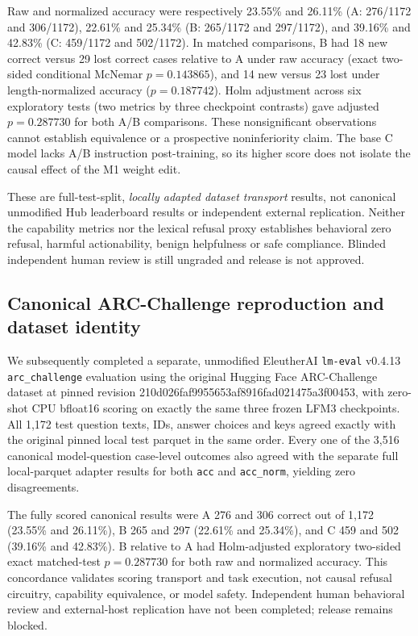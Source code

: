 \documentclass[11pt]{article}
\begin{document}
Raw and normalized accuracy were respectively 23.55\%
and 26.11\% (A: 276/1172 and 306/1172),
22.61\% and 25.34\% (B: 265/1172 and 297/1172),
and 39.16\% and 42.83\% (C: 459/1172 and
502/1172). In matched comparisons, B had 18 new
correct versus 29 lost correct cases relative to A
under raw accuracy (exact two-sided conditional
McNemar $p=0.143865$), and 14 new versus 23 lost
under length-normalized accuracy ($p=0.187742$).
Holm adjustment across six exploratory tests
(two metrics by three checkpoint contrasts)
gave adjusted $p=0.287730$ for both A/B
comparisons. These nonsignificant observations
cannot establish equivalence or a prospective
noninferiority claim. The base C model lacks
A/B instruction post-training, so its higher
score does not isolate the causal effect of
the M1 weight edit.

These are full-test-split, \emph{locally adapted
dataset transport} results, not canonical
unmodified Hub leaderboard results or
independent external replication. Neither
the capability metrics nor the lexical
refusal proxy establishes behavioral
zero refusal, harmful actionability, benign
helpfulness or safe compliance. Blinded
independent human review is still ungraded
and release is not approved.

\subsection{Canonical ARC-Challenge reproduction and dataset identity}
We subsequently completed a separate, unmodified EleutherAI
\texttt{lm-eval} v0.4.13 \texttt{arc\_challenge}
evaluation using the original Hugging Face ARC-Challenge
dataset at pinned revision 210d026faf9955653af8916fad021475a3f00453,
with zero-shot CPU bfloat16 scoring on exactly the same three
frozen LFM3 checkpoints. All 1,172 test question texts,
IDs, answer choices and keys agreed exactly with the
original pinned local test parquet in the same order.
Every one of the 3,516 canonical model-question case-level
outcomes also agreed with the separate full local-parquet
adapter results for both \texttt{acc} and
\texttt{acc\_norm}, yielding zero disagreements.

The fully scored canonical results were A 276 and 306
correct out of 1,172 (23.55\% and 26.11\%), B 265
and 297 (22.61\% and 25.34\%), and C 459 and
502 (39.16\% and 42.83\%). B relative to A
had Holm-adjusted exploratory two-sided exact
matched-test $p=0.287730$ for both raw and normalized
accuracy. This concordance validates scoring transport
and task execution, not causal refusal circuitry,
capability equivalence, or model safety. Independent
human behavioral review and external-host replication
have not been completed; release remains blocked.
\end{document}
